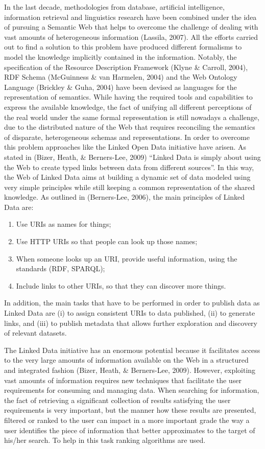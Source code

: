 In the last decade, methodologies from database, artificial intelligence, information retrieval and linguistics research have been combined under the idea of pursuing a Semantic Web that helps to overcome the challenge of dealing with vast amounts of heterogeneous information (Lassila, 2007). All the efforts carried out to find a solution to this problem have produced different formalisms to model the knowledge implicitly contained in the information. Notably, the specification of the Resource Description Framework (Klyne \& Carroll, 2004), RDF Schema (McGuinness \& van Harmelen, 2004) and the Web Ontology Language (Brickley \& Guha, 2004) have been devised as languages for the representation of semantics. While having the required tools and capabilities to express the available knowledge, the fact of unifying all different perceptions of the real world under the same formal representation is still nowadays a challenge, due to the distributed nature of the Web that requires reconciling the semantics of disparate, heterogeneous schemas and representations. In order to overcome this problem approaches like the Linked Open Data initiative have arisen. As stated in (Bizer, Heath, \& Berners-Lee, 2009) ``Linked Data is simply about using the Web to create typed links between data from different sources''. In this way, the Web of Linked Data aims at building a dynamic set of data modeled using very simple principles while still keeping a common representation of the shared knowledge. As outlined in (Berners-Lee, 2006), the main principles of Linked Data are:
\begin{enumerate}
	\item Use URIs as names for things;
	\item Use HTTP URIs so that people can look up those names;
	\item When someone looks up an URI, provide useful information, using the standards (RDF, SPARQL);
	\item Include links to other URIs, so that they can discover more things.
\end{enumerate}

In addition, the main tasks that have to be performed in order to publish data as Linked Data are (i) to assign consistent URIs to data published, (ii) to generate links, and (iii) to publish metadata that allows further exploration and discovery of relevant datasets.

The Linked Data initiative has an enormous potential because it facilitates access to the very large amounts of information available on the Web in a structured and integrated fashion (Bizer, Heath, \& Berners-Lee, 2009). However, exploiting vast amounts of information requires new techniques that facilitate the user requirements for consuming and managing data. When searching for information, the fact of retrieving a significant collection of results satisfying the user requirements is very important, but the manner how these results are presented, filtered or ranked to the user can impact in a more important grade the way a user identifies the piece of information that better approximates to the target of his/her search. To help in this task ranking algorithms are used.

